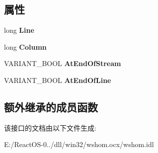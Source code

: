 \subsection*{属性}
\begin{DoxyCompactItemize}
\item 
\mbox{\label{interface_i_wsh_runtime_library_1_1_i_text_stream_a3e3bb12f042d9ffd5bb287566f45e3a6}} 
long {\bfseries Line}
\item 
\mbox{\label{interface_i_wsh_runtime_library_1_1_i_text_stream_a3fb13e9d8cdb0fb252514d5af746595b}} 
long {\bfseries Column}
\item 
\mbox{\label{interface_i_wsh_runtime_library_1_1_i_text_stream_a80855fa449f54b4c7128f866c73dbfe7}} 
V\+A\+R\+I\+A\+N\+T\+\_\+\+B\+O\+OL {\bfseries At\+End\+Of\+Stream}
\item 
\mbox{\label{interface_i_wsh_runtime_library_1_1_i_text_stream_aa8d28354733a32b4e61bb2c41f4c5f47}} 
V\+A\+R\+I\+A\+N\+T\+\_\+\+B\+O\+OL {\bfseries At\+End\+Of\+Line}
\end{DoxyCompactItemize}
\subsection*{额外继承的成员函数}


该接口的文档由以下文件生成\+:\begin{DoxyCompactItemize}
\item 
E\+:/\+React\+O\+S-\/0../dll/win32/wshom.\+ocx/wshom.\+idl\end{DoxyCompactItemize}
